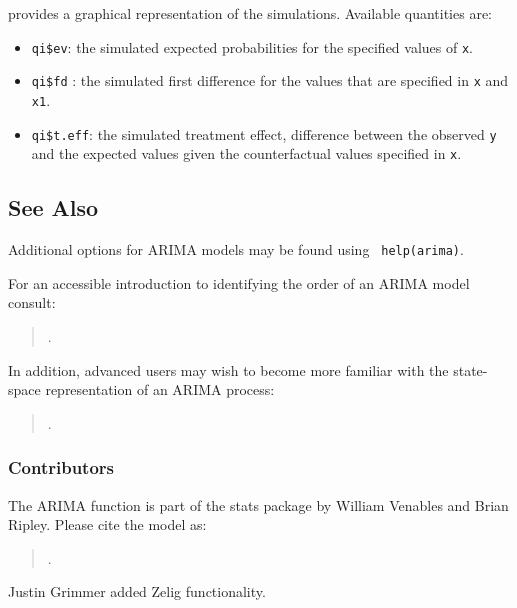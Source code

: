 \begin{itemize}
  provides a graphical representation of the simulations.  Available
  quantities are:
\begin{itemize}
\item {\tt qi\$ev}: the simulated expected probabilities for the
  specified values of {\tt x}.  
\item {\tt qi\$fd} : the simulated first difference for the values
  that are specified in {\tt x} and {\tt x1}.
\item{ \tt qi\$t.eff}: the simulated treatment effect, difference
between the observed {\tt y} and the expected values given the
counterfactual values specified in {\tt x}.     
\end{itemize}  
\end{itemize}

\subsection*{See Also}

Additional options for ARIMA models may be found using {\tt
help(arima)}.  

For an accessible introduction to identifying the order of an ARIMA
model consult: 
\begin{verse}
.
\end{verse}
In addition, advanced users may wish to become more familiar with the state-space
representation of an ARIMA process:
\begin{verse}
.
\end{verse}

\subsubsection*{Contributors}
The ARIMA function is part of the stats package by William Venables
and Brian Ripley.  Please cite the model as: 
\begin{verse}
.
\end{verse}
Justin Grimmer added Zelig functionality.  

